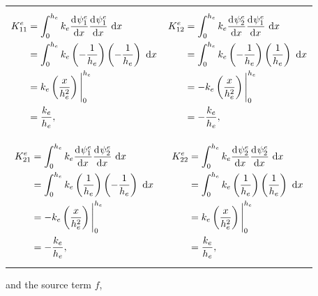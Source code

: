 \begin{table}[H]
\centering
\scriptsize
\begin{tabularx}{\linewidth}{XX}
{\begin{align*}
  K_{11}^e &= \int_0^{h_e} k_e \frac{\mathrm{d}^{} \psi_1^e}{\mathrm{d} x^{} } \frac{\mathrm{d}^{} \psi_1^e}{\mathrm{d} x^{} } \ \mathrm{d}x \\
           &= \int_0^{h_e} k_e \left( -\frac{1}{h_e} \right) \left( -\frac{1}{h_e} \right) \ \mathrm{d}x \\
           &= k_e \left(\frac{x}{h_e^2} \right) \Bigg|_0^{h_e} \\
           &= \frac{k_e}{h_e},
\end{align*}}
&
{\begin{align*}
  K_{12}^e &= \int_0^{h_e} k_e \frac{\mathrm{d}^{} \psi_2^e}{\mathrm{d} x^{} } \frac{\mathrm{d}^{} \psi_1^e}{\mathrm{d} x^{} } \ \mathrm{d}x \\
           &= \int_0^{h_e} k_e \left( -\frac{1}{h_e} \right) \left( \frac{1}{h_e} \right) \ \mathrm{d}x \\
           &= -k_e \left(\frac{x}{h_e^2} \right) \Bigg|_0^{h_e} \\
           &= -\frac{k_e}{h_e},
\end{align*}} \\ 
{\begin{align*}
  K_{21}^e &= \int_0^{h_e} k_e \frac{\mathrm{d}^{} \psi_1^e}{\mathrm{d} x^{} } \frac{\mathrm{d}^{} \psi_2^e}{\mathrm{d} x^{} } \ \mathrm{d}x \\
           &= \int_0^{h_e} k_e \left( \frac{1}{h_e} \right) \left( -\frac{1}{h_e} \right) \ \mathrm{d}x \\
           &= -k_e \left(\frac{x}{h_e^2} \right) \Bigg|_0^{h_e} \\
           &= -\frac{k_e}{h_e},
\end{align*}}
&
{\begin{align*}
  K_{22}^e &= \int_0^{h_e} k_e \frac{\mathrm{d}^{} \psi_2^e}{\mathrm{d} x^{} } \frac{\mathrm{d}^{} \psi_2^e}{\mathrm{d} x^{} } \ \mathrm{d}x \\
           &= \int_0^{h_e} k_e \left( \frac{1}{h_e} \right) \left( \frac{1}{h_e} \right) \ \mathrm{d}x \\
           &= k_e \left(\frac{x}{h_e^2} \right) \Bigg|_0^{h_e} \\
           &= \frac{k_e}{h_e},
\end{align*}}
\end{tabularx}
\end{table}
and the source term $f$,
